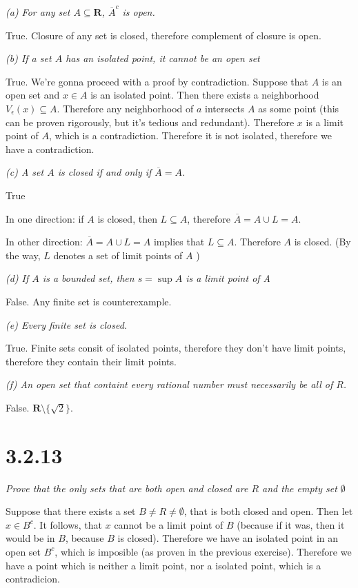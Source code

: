 \documentclass[11pt,oneside,titlepage]{article}
\begin{document}
\textit{(a) For any set $A \subseteq \textbf{R}$, $\overline A^c$ is open.}

True. Closure of any set is closed, therefore complement of closure is open.

\textit{(b) If a set $A$ has an isolated point, it cannot be an open set}

True. We're gonna proceed with a proof by contradiction.
Suppose that $A$ is an open set and $x \in A$ is an isolated point. Then there
exists a neighborhood $V_\epsilon(x) \subseteq A$. Therefore any neighborhood
of $a$ intersects $A$ as some point (this can be proven rigorously, but it's
tedious and redundant). Therefore $x$ is a limit point of $A$, which is a
contradiction. Therefore it is not isolated, therefore we have a contradiction.

\textit{(c) A set $A$ is closed if and only if $\overline A = A$.}

True

In one direction: if $A$ is closed, then $L \subseteq A$, therefore
$\overline A = A \cup L  = A$.

In other direction: $\overline A = A \cup L  = A$ implies that $L \subseteq A$.
Therefore $A$ is closed. (By the way, $L$ denotes a set of limit points of $A$ )

\textit{(d) If $A$ is a bounded set, then $s = \sup A$ is a limit point of A}

False. Any finite set is counterexample.

\textit{(e) Every finite set is closed.}

True. Finite sets consit of isolated points, therefore they don't have limit
points, therefore they contain their limit points.

\textit{(f) An open set that containt every rational number must necessarily be
  all of $R$.}

False. $\textbf{R} \setminus \{\sqrt{2}\}$.

\section*{3.2.13}
\textit{Prove that the only sets that are both open and closed are $R$ and
  the empty set $\emptyset$}

Suppose that there exists a set $B \neq R \neq \emptyset$, that is both
closed and open. Then let $x \in B^c$. It follows, that $x$ cannot be a limit
point of $B$ (because if it was, then it would be in $B$, because $B$ is closed).
Therefore we have an isolated point in an open set $B^c$, which is imposible
(as proven in the previous exercise). Therefore we have a point which is
neither a limit point, nor a isolated point, which is a contradicion.
\end{document}
